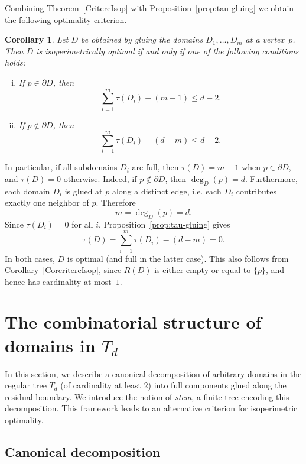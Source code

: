 \documentclass[a4paper, 11pt]{article}
\numberwithin{equation}{section}
\newtheorem{corollary}[theorem]{Corollary}
\theoremstyle{definition}
\theoremstyle{remark}
\begin{document}
\medskip

Combining Theorem~\ref{CritereIsop} with Proposition~\ref{prop:tau-gluing} we obtain the following optimality criterion.
\begin{corollary}\label{cor:gluing-optimal}
Let $D$ be obtained by gluing the domains $D_1,\dots,D_m$ at a vertex~$p$.
Then $D$ is isoperimetrically optimal if and only if one of the following conditions holds:
\begin{enumerate}[(i)]
\item If $p\in\partial D$, then
      \[
         \sum_{i=1}^m \tau(D_i)+(m-1)  \leq  d-2.
      \]
\item If $p\notin\partial D$, then
      \[
         \sum_{i=1}^m \tau(D_i)-(d-m)  \leq  d-2.
      \]
\end{enumerate}
\end{corollary}

In particular, if all subdomains $D_i$ are full, then $\tau(D)=m-1$ when $p\in\partial D$, and $\tau(D)=0$ otherwise. 
Indeed, if $p\notin\partial D$, then $\deg_D(p)=d$.  Furthermore, each domain $D_i$ is glued at $p$ along a distinct edge, i.e. each $D_i$ contributes exactly one neighbor of $p$. Therefore 
\[
 m = \deg_D(p)=d.
\]
Since $\tau(D_i)=0$ for all $i$, Proposition~\ref{prop:tau-gluing} gives
\[
   \tau(D)=\sum_{i=1}^m \tau(D_i)-(d-m)=0.
\]
In both cases, $D$ is optimal (and full in the latter case). 
This also follows from Corollary~\ref{CorcritereIsop}, since $R(D)$ is either empty or equal to $\{p\}$, and hence has cardinality at most~$1$.

\medskip 


\section{The combinatorial structure of  domains in $T_d$}
\label{sec.combstructure}

In this section, we describe a canonical decomposition of arbitrary domains in the regular tree $T_d$ (of cardinality at least $2$) 
into full components glued along the residual boundary.  We introduce the notion of \textit{stem}, a finite tree encoding this decomposition. This framework leads to an alternative criterion for isoperimetric optimality.


\subsection{Canonical decomposition}
\label{subsec.decomposition}
\end{document}
